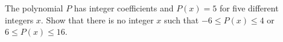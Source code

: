The polynomial $P$ has integer coefficients and $P(x)=5$ for five different integers $x$. Show that there is no integer $x$ such that $-6\le P(x)\le 4$ or $6\le P(x)\le 16$.
